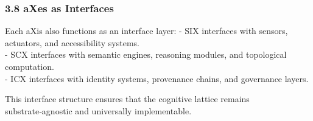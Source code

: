 \subsubsection{3.8 aXes as Interfaces}\label{axes-as-interfaces}

Each aXis also functions as an interface layer: - SIX interfaces with sensors, actuators, and accessibility systems.\\
- SCX interfaces with semantic engines, reasoning modules, and topological computation.\\
- ICX interfaces with identity systems, provenance chains, and governance layers.

This interface structure ensures that the cognitive lattice remains substrate‑agnostic and universally implementable.
